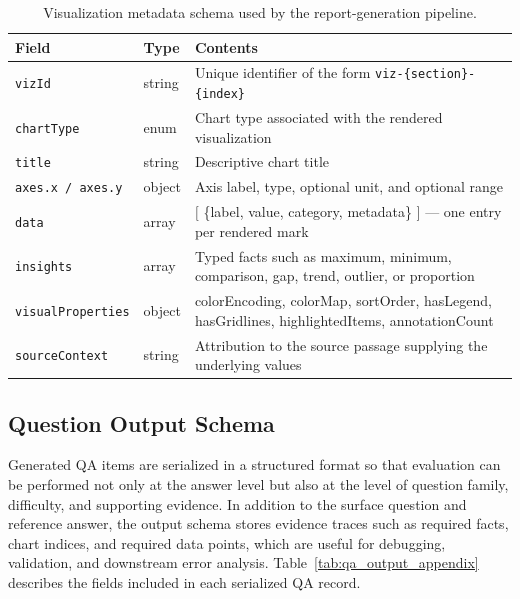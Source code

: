 \documentclass{article} %
\begin{document}
\begin{table}[!htbp]
\centering
\small
\caption{Visualization metadata schema used by the report-generation pipeline.}
\label{tab:viz_schema_appendix}
\begin{tabular}{llp{10cm}}
\toprule
\textbf{Field} & \textbf{Type} & \textbf{Contents} \\
\midrule
\texttt{vizId}            & string  & Unique identifier of the form \texttt{viz-\{section\}-\{index\}} \\
\texttt{chartType}        & enum    & Chart type associated with the rendered visualization \\
\texttt{title}            & string  & Descriptive chart title \\
\texttt{axes.x / axes.y}  & object  & Axis label, type, optional unit, and optional range \\
\texttt{data}             & array   & $[$ \{label, value, category, metadata\} $]$ --- one entry per rendered mark \\
\texttt{insights}         & array   & Typed facts such as maximum, minimum, comparison, gap, trend, outlier, or proportion \\
\texttt{visualProperties} & object  & colorEncoding, colorMap, sortOrder, hasLegend, hasGridlines, highlightedItems, annotationCount \\
\texttt{sourceContext}    & string  & Attribution to the source passage supplying the underlying values \\
\bottomrule
\end{tabular}
\end{table}

\subsection{Question Output Schema}
\label{app:qa_schema}

Generated QA items are serialized in a structured format so that evaluation can be
performed not only at the answer level but also at the level of question family,
difficulty, and supporting evidence. In addition to the surface question and reference
answer, the output schema stores evidence traces such as required facts, chart indices,
and required data points, which are useful for debugging, validation, and downstream
error analysis. Table~\ref{tab:qa_output_appendix} describes the fields included in each
serialized QA record.
\end{document}
